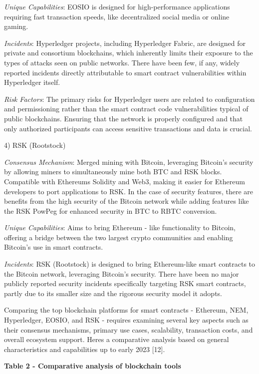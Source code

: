 \emph{Unique Capabilities}: EOSIO is designed for high-performance
applications requiring fast transaction speeds, like decentralized
social media or online gaming.

\emph{Incidents}: Hyperledger projects, including Hyperledger Fabric,
are designed for private and consortium blockchains, which inherently
limits their exposure to the types of attacks seen on public networks.
There have been few, if any, widely reported incidents directly
attributable to smart contract vulnerabilities within Hyperledger
itself.

\emph{Risk Factors}: The primary risks for Hyperledger users are related
to configuration and permissioning rather than the smart contract code
vulnerabilities typical of public blockchains. Ensuring that the network
is properly configured and that only authorized participants can access
sensitive transactions and data is crucial.

4) RSK (Rootstock)

\emph{Consensus Mechanism}: Merged mining with Bitcoin, leveraging
Bitcoin's security by allowing miners to simultaneously mine both BTC
and RSK blocks. Compatible with Ethereum\textquotesingle s Solidity and
Web3, making it easier for Ethereum developers to port applications to
RSK. In the case of security features, there are benefits from the high
security of the Bitcoin network while adding features like the RSK
PowPeg for enhanced security in BTC to RBTC conversion.

\emph{Unique Capabilities}: Aims to bring Ethereum - like functionality
to Bitcoin, offering a bridge between the two largest crypto communities
and enabling Bitcoin's use in smart contracts.

\emph{Incidents}: RSK (Rootstock) is designed to bring Ethereum-like
smart contracts to the Bitcoin network, leveraging Bitcoin's security.
There have been no major publicly reported security incidents
specifically targeting RSK smart contracts, partly due to its smaller
size and the rigorous security model it adopts.

Comparing the top blockchain platforms for smart contracts - Ethereum,
NEM, Hyperledger, EOSIO, and RSK - requires examining several key
aspects such as their consensus mechanisms, primary use cases,
scalability, transaction costs, and overall ecosystem support.
Here\textquotesingle s a comparative analysis based on general
characteristics and capabilities up to early 2023 {[}12{]}.

\textbf{Table 2 - Comparative analysis of blockchain tools}

